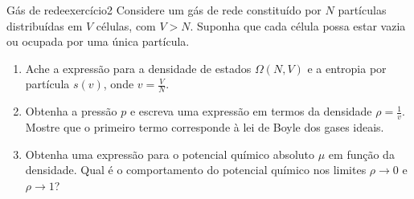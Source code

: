 \begin{exercício}{Gás de rede}{exercício2}
    Considere um gás de rede constituído por \(N\) partículas distribuídas em \(V\) células, com \(V > N\). Suponha que cada célula possa estar vazia ou ocupada por uma única partícula.
    \begin{enumerate}[label=(\alph*)]
        \item Ache a expressão para a densidade de estados \(\Omega(N, V)\) e a entropia por partícula \(s(v)\), onde \(v = \frac{V}{N}\).
        \item Obtenha a pressão \(p\) e escreva uma expressão em termos da densidade \(\rho = \frac1v\). Mostre que o primeiro termo corresponde à lei de Boyle dos gases ideais.
        \item Obtenha uma expressão para o potencial químico absoluto \(\mu\) em função da densidade. Qual é o comportamento do potencial químico nos limites \(\rho \to 0\) e \(\rho \to 1\)?
    \end{enumerate}
\end{exercício}
